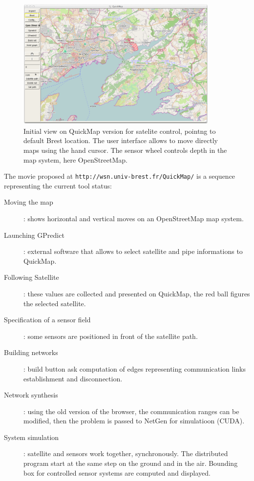 \begin{figure}
\begin{center}
\includegraphics[width=10cm]{QuickMapSatBrest.png}
\caption{Initial view on QuickMap version for satelite control,
pointng to default Brest location. The user interface allows to move directly maps using
the hand cursor. The sensor wheel controls depth in the map system, here OpenStreetMap.}
\label{fig:initialQuickMapBrest}
\end{center}
\end{figure}

The movie proposed at  {\tt http://wsn.univ-brest.fr/QuickMap/} is a sequence representing 
the current tool status:

\begin{description}
\item  [Moving the map ]: shows horizontal and vertical moves on an OpenStreetMap map system. 
\item [Launching GPredict  ]: external software that allows to select satellite and pipe informations to QuickMap. 
\item [Following Satellite ]: these values are collected and presented on QuickMap, the red ball figures the selected satellite. 
\item [Specification of a sensor field]: some sensors are positioned in front of the satellite path.
\item [Building networks ]: build button ask computation of edges representing communication links establishment and disconnection.
\item [Network synthesis ]: using the old version of the browser, the communication ranges can be modified, then the problem is passed to NetGen for simulatioon (CUDA).
\item [System simulation ]:  satellite and sensors work together, synchronously. The distributed program start at the same step
on the ground and in the air. Bounding box for controlled sensor systems are computed and displayed.
\end{description}


